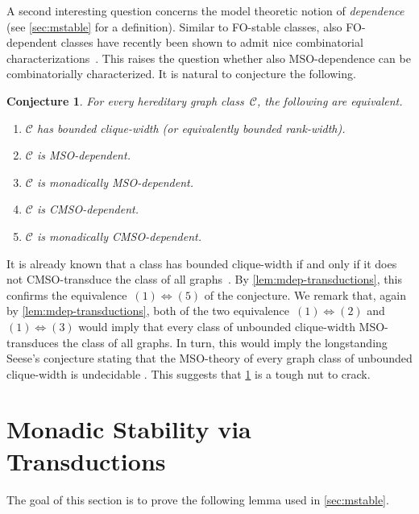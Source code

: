 \documentclass[11pt]{article}      \usepackage[margin=1in]{geometry}  \usepackage{microtype}
\newtheorem{conjecture}[theorem]{Conjecture}
\theoremstyle{definition}
\newcommand{\CC}{\mathcal{C}}
\begin{document}
A second interesting question concerns the model theoretic notion of \emph{dependence} (see \cref{sec:mstable} for a definition).
Similar to FO-stable classes, also FO-dependent classes have recently been shown to admit nice combinatorial characterizations~\cite{dreier2024flipbreakability}.
This raises the question whether also MSO-dependence can be combinatorially characterized.
It is natural to conjecture the following.

\begin{conjecture}\label{conj:cw}
  For every hereditary graph class~$\CC$, the following are equivalent.
  \begin{enumerate}
    \item $\CC$ has bounded clique-width (or equivalently bounded rank-width).
    \item $\CC$ is MSO-dependent.
    \item $\CC$ is monadically MSO-dependent.
    \item $\CC$ is CMSO-dependent.
    \item $\CC$ is monadically CMSO-dependent.
  \end{enumerate}
\end{conjecture}

It is already known that a class has bounded clique-width if and only if it does not CMSO-transduce the class of all graphs~\cite{COURCELLE200791}.
By \cref{lem:mdep-transductions}, this confirms the equivalence~$(1)\Leftrightarrow(5)$ of the conjecture.
We remark that, again by \cref{lem:mdep-transductions}, both of the two equivalence~$(1)\Leftrightarrow (2)$ and~$(1)\Leftrightarrow (3)$ would imply that every class of unbounded clique-width MSO-transduces the class of all graphs.
In turn, this would imply the longstanding Seese's conjecture stating that the MSO-theory of every graph class of unbounded clique-width is undecidable \cite{seese1991conjecture, courcelle2012graph}.
This suggests that \cref{conj:cw} is a tough nut to crack. 



\newpage
\appendix

\section{Monadic Stability via Transductions}

\newcommand{\Th}{\mathrm{Th}}

The goal of this section is to prove the following lemma used in \cref{sec:mstable}.
\end{document}
